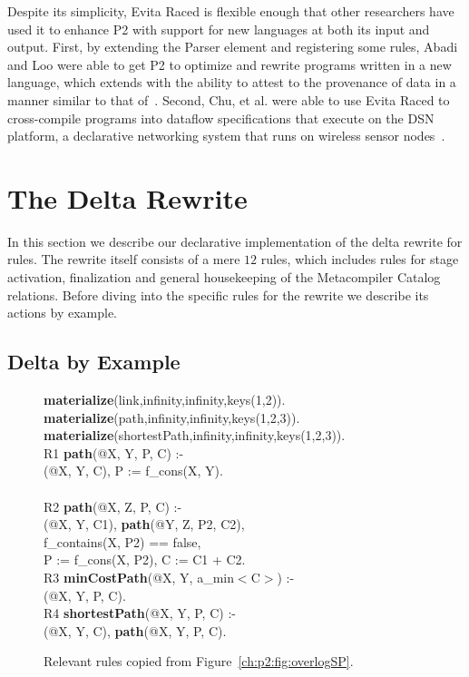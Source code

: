 Despite its simplicity, Evita Raced is flexible enough that other researchers
have used it to enhance P2 with support for new languages at both its input and
output.  First, by extending the Parser element and registering some \OVERLOG
rules, Abadi and Loo were able to get P2 to optimize and rewrite programs
written in a new language, which extends \OVERLOG with the ability to attest to
the provenance of data in a manner similar to that of~\cite{abadi-netdb07}.
Second, Chu, et al. were able to use Evita Raced to cross-compile \OVERLOG programs
into dataflow specifications that execute on the DSN platform, a declarative
networking system that runs on wireless sensor nodes~\cite{chu-sensys07}.


\section{The Delta Rewrite}
\label{ch:evita:sec:delta}

In this section we describe our declarative implementation of the delta rewrite
for \OVERLOG rules.  The rewrite itself consists of a mere $12$ rules, which
includes rules for stage activation, finalization and general housekeeping of
the Metacompiler Catalog relations.  Before diving into the specific rules for
the rewrite we describe its actions by example.

\subsection{Delta by Example}

\begin{figure}[!t]
\ssp
\centering
\begin{boxedminipage}{\linewidth}
{\bf materialize}(link,infinity,infinity,keys(1,2)). \\
{\bf materialize}(path,infinity,infinity,keys(1,2,3)).  \\
{\bf materialize}(shortestPath,infinity,infinity,keys(1,2,3)). \\
  
R1 {\bf path}(@X, Y, P, C) :- \\
(@X, Y, C), P := f\_cons(X, Y). \\
\\
R2 {\bf path}(@X, Z, P, C) :- \\
(@X, Y, C1), {\bf path}(@Y, Z, P2, C2),\\
\datalogspace f\_contains(X, P2) == false, \\
\datalogspace P := f\_cons(X, P2), C := C1 + C2. \\

R3 {\bf minCostPath}(@X, Y, a\_min$<$C$>$) :-  \\
(@X, Y, P, C). \\ 

R4 {\bf shortestPath}(@X, Y, P, C) :- \\
(@X, Y, C), {\bf path}(@X, Y, P, C).

\end{boxedminipage}
\caption{\label{ch:evita:fig:basicSP}Relevant rules copied from Figure~\ref{ch:p2:fig:overlogSP}.}
\end{figure}

